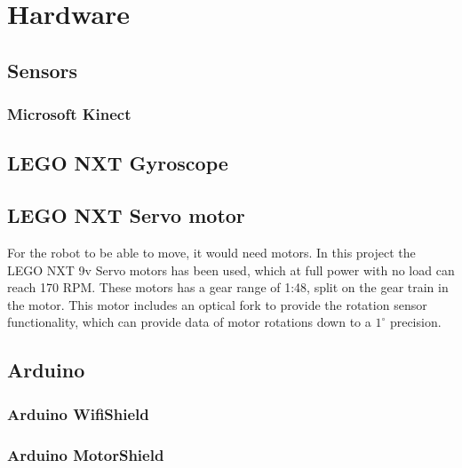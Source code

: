 \chapter{Hardware}
\label{chap:Hardware}

\section{Sensors}
\label{sec:Sensors}

\subsection{Microsoft Kinect}
\label{sec:Microsoft Kinect}

\section{LEGO NXT Gyroscope}
\label{sec:LEGO NXT Gyroscope}

\section{LEGO NXT Servo motor}
\label{sec:LEGO NXT Servo motor}
For the robot to be able to move, it would need motors. In this project the LEGO NXT 9v Servo motors has been used, which at full power with no load can reach 170 RPM. These motors has a gear range of 1:48, split on the gear train in the motor. This motor includes an optical fork to provide the rotation sensor functionality, which can provide data of motor rotations down to a \(1^{\circ}\) precision.

\section{Arduino}
\label{sec:Arduino}

\subsection{Arduino WifiShield}
\label{sec: Arduino WifiShield}

\subsection{Arduino MotorShield}
\label{sec:Arduino MotorShield}